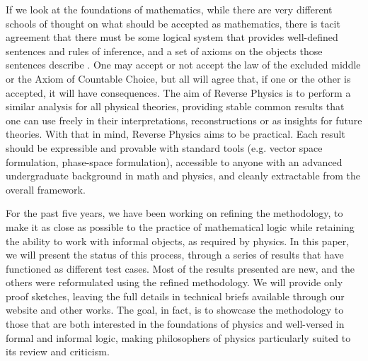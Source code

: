 \documentclass[entropy,article,submit,moreauthors]{Definitions/mdpi}
\begin{document}
If we look at the foundations of mathematics, while there are very different schools of thought on what should be accepted as mathematics, there is tacit agreement that there must be some logical system that provides well-defined sentences and rules of inference, and a set of axioms on the objects those sentences describe \cite{Horsten2022,Ferreiros2008}. One may accept or not accept the law of the excluded middle or the Axiom of Countable Choice, but all will agree that, if one or the other is accepted, it will have consequences. The aim of Reverse Physics \cite{aop-phys-ReversePhysics} is to perform a similar analysis for all physical theories, providing stable common results that one can use freely in their interpretations, reconstructions or as insights for future theories. With that in mind, Reverse Physics aims to be practical. Each result should be expressible and provable with standard tools (e.g. vector space formulation, phase-space formulation), accessible to anyone with an advanced undergraduate background in math and physics, and cleanly extractable from the overall framework.

For the past five years, we have been working on refining the methodology, to make it as close as possible to the practice of mathematical logic while retaining the ability to work with informal objects, as required by physics. In this paper, we will present the status of this process, through a series of results that have functioned as different test cases. Most of the results presented are new, and the others were reformulated using the refined methodology. We will provide only proof sketches, leaving the  full details in technical briefs available through our website \cite{AssumptionsOfPhysicsWebsite} and other works. The goal, in fact, is to showcase the methodology to those that are both interested in the foundations of physics and well-versed in formal and informal logic, making philosophers of physics particularly suited to its review and criticism.
\end{document}
